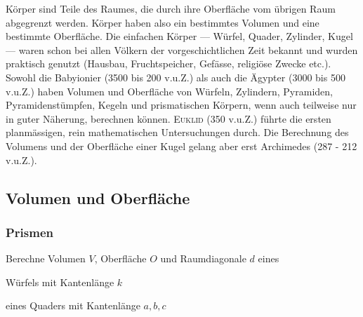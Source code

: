 \documentclass[%
11pt,%
twoside,%
titlepage,%
a4page,%
german,%
headsepline%
]{scrartcl}
\begin{document}
K\"orper sind Teile des Raumes, die durch ihre Oberfl\"ache vom \"ubrigen Raum abgegrenzt werden. K\"orper haben also ein bestimmtes Volumen und eine bestimmte Oberfl\"ache.
Die einfachen K\"orper --- W\"urfel, Quader, Zylinder, Kugel --- waren schon bei allen V\"olkern der vorgeschichtlichen Zeit bekannt und wurden praktisch genutzt (Hausbau, Fruchtspeicher, Gef\"asse, religi\"ose Zwecke etc.). Sowohl die Babyionier (3500 bis 200 v.u.Z.) als auch die \"Agypter (3000 bis 500 v.u.Z.) haben Volumen und Oberfl\"ache von W\"urfeln, Zylindern, Pyramiden, Pyramidenst\"umpfen, Kegeln und prismatischen K\"orpern, wenn auch teilweise nur in guter N\"aherung, berechnen k\"onnen. \textsc{Euklid} (350 v.u.Z.) f\"uhrte die ersten planm\"assigen, rein mathematischen Untersuchungen durch. Die Berechnung des Volumens und der Oberfl\"ache einer Kugel gelang aber erst Archimedes (287 - 212 v.u.Z.).

\subsection{Volumen und Oberfl\"ache}
\subsubsection{Prismen}
\begin{ueb}
Berechne Volumen $V$, Oberfl\"ache $O$ und Raumdiagonale $d$ eines
\begin{enumeratea}
\item W\"urfels mit Kantenl\"ange $k$
\item eines Quaders mit Kantenl\"ange $a,b,c$
\end{enumeratea}
\end{ueb}
\end{document}
